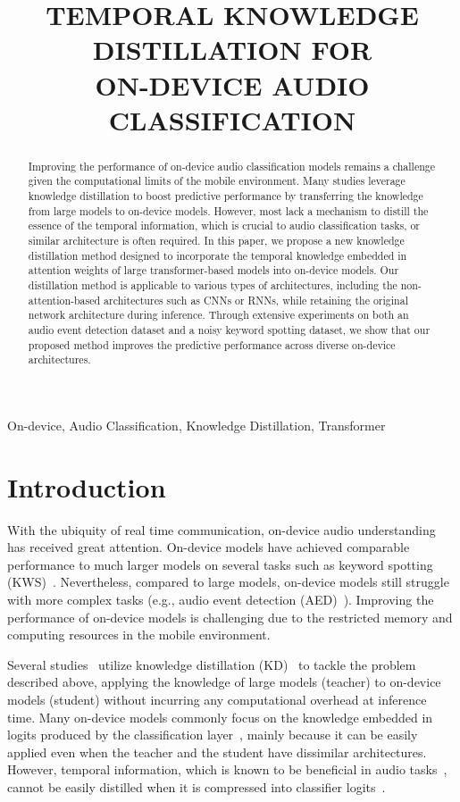 \documentclass{article}
\title{TEMPORAL KNOWLEDGE DISTILLATION FOR \\ ON-DEVICE AUDIO CLASSIFICATION}
\begin{document}
\maketitle
\begin{abstract}\label{sec:0_abstract}
Improving the performance of on-device audio classification models remains a challenge given the computational limits of the mobile environment.
Many studies leverage knowledge distillation to boost predictive performance by transferring the knowledge from large models to on-device models.
However, most lack a mechanism to distill the essence of the temporal information, which is crucial to audio classification tasks, or similar architecture is often required.
In this paper, we propose a new knowledge distillation method designed to incorporate the temporal knowledge embedded in attention weights of large transformer-based models into on-device models.
Our distillation method is applicable to various types of architectures, including the non-attention-based architectures such as CNNs or RNNs, while retaining the original network architecture during inference.
Through extensive experiments on both an audio event detection dataset and a noisy keyword spotting dataset, we show that our proposed method improves the predictive performance across diverse on-device architectures.
\end{abstract}

\begin{keywords}
On-device, Audio Classification, Knowledge Distillation, Transformer
\end{keywords} 



\section{Introduction}\label{sec:1_introduction}
With the ubiquity of real time communication, on-device audio understanding has received great attention.
On-device models have achieved comparable performance to much larger models on several tasks such as keyword spotting (KWS)~\cite{speechcommandsv2, Rybakov_2020}.
Nevertheless, compared to large models, on-device models still struggle with more complex tasks (e.g., audio event detection (AED)~\cite{fonseca2020fsd50k}).
Improving the performance of on-device models is challenging due to the restricted memory and computing resources in the mobile environment.

Several studies~\cite{FutamiIUMSK20,Lu2017KnowledgeDF} utilize knowledge distillation (KD)~\cite{hinton2015distilling} to tackle the problem described above, applying the knowledge of large models (teacher) to on-device models (student) without incurring any computational overhead at inference time.
Many on-device models commonly focus on the knowledge embedded in logits produced by the classification layer~\cite{FutamiIUMSK20,Lu2017KnowledgeDF,berg21_interspeech}, mainly because it can be easily applied even when the teacher and the student have dissimilar architectures.
However, temporal information, which is known to be beneficial in audio tasks~\cite{MunimIS19}, cannot be easily distilled when it is compressed into classifier logits~\cite{codert21}.
\end{document}

